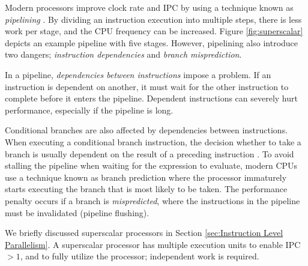 Modern processors improve clock rate and IPC by using a technique known as \textit{pipelining} \cite{Boncz2005-wj}. By dividing an instruction execution into multiple steps, there is less work per stage, and the CPU frequency can be increased. Figure \ref{fig:superscalar} depicts an example pipeline with five stages. However, pipelining also introduce two dangers; \textit{instruction dependencies} and \textit{branch misprediction}.

In a pipeline, \textit{dependencies between instructions} impose a problem. If an instruction is dependent on another, it must wait for the other instruction to complete before it enters the pipeline. Dependent instructions can severely hurt performance, especially if the pipeline is long.

Conditional branches are also affected by dependencies between instructions. When executing a conditional branch instruction, the decision whether to take a branch is usually dependent on the result of a preceding instruction \cite{Boncz2005-wj}. To avoid stalling the pipeline when waiting for the expression to evaluate, modern CPUs use a technique known as branch prediction where the processor immaturely starts executing the branch that is most likely to be taken. The performance penalty occurs if a branch is \textit{mispredicted}, where the instructions in the pipeline must be invalidated (pipeline flushing).

We briefly discussed superscalar processors in Section \ref{sec:Instruction Level Parallelism}. A superscalar processor has multiple execution units to enable IPC $> 1$, and to fully utilize the processor; independent work is required.

